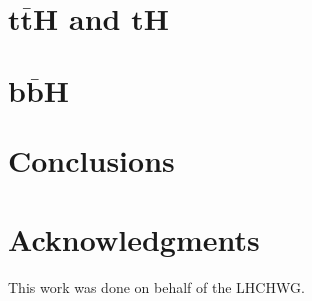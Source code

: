 \documentclass[11pt]{report}
\begin{document}
\section*{$\boldsymbol{t\bar{t}H}$ and $\boldsymbol{tH}$}


\section*{$\boldsymbol{b\bar{b}H}$}


\section*{Conclusions}

\section*{Acknowledgments}
This work was done on behalf of the LHCHWG.
\newpage


\end{document}
